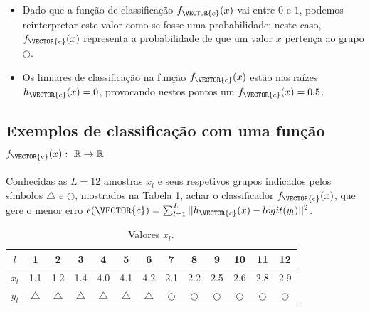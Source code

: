 \begin{tcbattention}
\begin{itemize}
\item Dado que a função de classificação $f_{\VECTOR{c}}(x)$ vai entre $0$ e $1$,
podemos reinterpretar este valor como se fosse uma probabilidade;
neste caso, $f_{\VECTOR{c}}(x)$ representa a probabilidade de que um valor $x$
pertença ao grupo $\bigcirc$.
\item Os limiares de classificação na função $f_{\VECTOR{c}}(x)$ estão nas raízes $h_{\VECTOR{c}}(x)=0$,
provocando nestos pontos um $f_{\VECTOR{c}}(x)=0.5$.
\end{itemize}
\end{tcbattention}



\subsection{Exemplos de classificação com uma função
$f_{\VECTOR{c}}(x):~\mathbb{R} \rightarrow \mathbb{R}$ }

\begin{example}\label{ex:theo:reglogr1r1poly}
Conhecidas as $L=12$ amostras $x_l$ e seus respetivos grupos indicados pelos símbolos $\bigtriangleup$ e $\bigcirc$, 
mostrados na Tabela \ref{table:theo:reglogr1r1poly:xn},
achar o classificador $f_{\VECTOR{c}}(x)$, 
que gere o menor erro $e(\VECTOR{c}) =   \sum_{l=1}^{L} ||h_{\VECTOR{c}}(x)-logit(y_l)||^2$.
\end{example}


\begin{table}[h!]
\centering
\begin{tabular}{|c||c|c|c|c|c|c||c|c|c|c|c|c|} 
 \hline
$l$   & 1 & 2 & 3 & 4 & 5 & 6 & 7 & 8 & 9 & 10 & 11 & 12\\ \hline \hline
$x_l$ & 1.1 & 1.2 & 1.4 & 4.0 & 4.1 & 4.2 & 2.1 & 2.2 & 2.5 & 2.6 & 2.8 & 2.9 \\ \hline
$y_l$ & $\bigtriangleup$ & $\bigtriangleup$ & $\bigtriangleup$ & $\bigtriangleup$ & $\bigtriangleup$ & $\bigtriangleup$
      & $\bigcirc$ & $\bigcirc$ & $\bigcirc$ & $\bigcirc$ & $\bigcirc$ & $\bigcirc$ \\ \hline
\end{tabular}
\caption{Valores $x_l$.}
\label{table:theo:reglogr1r1poly:xn}
\end{table}



